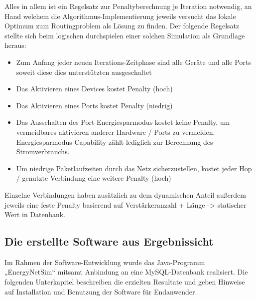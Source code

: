 Alles in allem ist ein Regelsatz zur Penaltyberechnung je Iteration notwendig, an Hand welchem die Algorithmus-Implementierung jeweils versucht das lokale Optimum zum Routingproblem als Lösung zu finden.
Der folgende Regelsatz stellte sich beim logischen durchspielen einer solchen Simulation als Grundlage heraus:
\begin{itemize}
	\item Zum Anfang jeder neuen Iterations-Zeitphase sind alle Geräte und alle Ports soweit diese dies unterstützten ausgeschaltet
	\item Das Aktivieren eines Devices kostet Penalty (hoch)
	\item Das Aktivieren eines Ports kostet Penalty (niedrig)
	\item Das Ausschalten des Port-Energiesparmodus kostet keine Penalty, um vermeidbares aktivieren anderer Hardware / Ports zu vermeiden. Energiesparmodus-Capability zählt lediglich zur Berechnung des Stromverbrauchs.
	\item Um niedrige Paketlaufzeiten durch das Netz sicherzustellen, kostet jeder Hop / genutzte Verbindung eine weitere Penalty (hoch)
\end{itemize}
Einzelne Verbindungen haben zusätzlich zu dem dynamischen Anteil außerdem jeweils eine feste Penalty basierend auf Verstärkeranzahl + Länge -> statischer Wert in Datenbank.



\subsection{Die erstellte Software aus Ergebnissicht}\label{subsec:ErgSoftware}
Im Rahmen der Software-Entwicklung wurde das Java-Programm „EnergyNetSim“ mitsamt Anbindung an eine MySQL-Datenbank realisiert. Die folgenden Unterkapitel beschreiben die erzielten Resultate und geben Hinweise auf Installation und Benutzung der Software für Endanwender.

